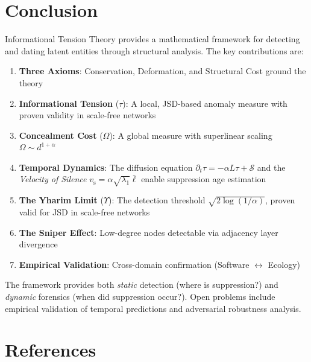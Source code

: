 \documentclass[11pt,a4paper]{article}
\theoremstyle{definition}
\theoremstyle{remark}
\newcommand{\Yharim}{\Upsilon}
\newcommand{\vsilence}{v_{\mathrm{s}}}
\begin{document}
\section{Conclusion}

Informational Tension Theory provides a mathematical framework for detecting and dating latent entities through structural analysis. The key contributions are:

\begin{enumerate}
    \item \textbf{Three Axioms}: Conservation, Deformation, and Structural Cost ground the theory
    \item \textbf{Informational Tension} ($\tau$): A local, JSD-based anomaly measure with proven validity in scale-free networks
    \item \textbf{Concealment Cost} ($\Omega$): A global measure with superlinear scaling $\Omega \sim d^{1+\alpha}$
    \item \textbf{Temporal Dynamics}: The diffusion equation $\partial_t \tau = -\alpha L\tau + \mathcal{S}$ and the \emph{Velocity of Silence} $\vsilence = \alpha\sqrt{\lambda_1}\bar{\ell}$ enable suppression age estimation
    \item \textbf{The Yharim Limit} ($\Yharim$): The detection threshold $\sqrt{2\log(1/\alpha)}$, proven valid for JSD in scale-free networks
    \item \textbf{The Sniper Effect}: Low-degree nodes detectable via adjacency layer divergence
    \item \textbf{Empirical Validation}: Cross-domain confirmation (Software $\leftrightarrow$ Ecology)
\end{enumerate}

The framework provides both \emph{static} detection (where is suppression?) and \emph{dynamic} forensics (when did suppression occur?). Open problems include empirical validation of temporal predictions and adversarial robustness analysis.

\section*{References}
\end{document}
